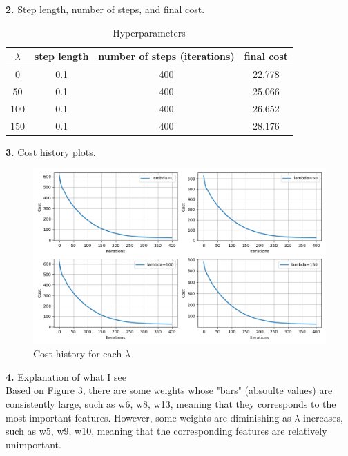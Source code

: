 \textbf{2.} Step length, number of steps, and final cost.
\begin{table}[H]
    \centering
    \begin{tabular}{|c|c|c|c|}
        \hline
         $\lambda$ &  step length &  number of steps (iterations) & final cost \\
        \hline
         0 & 0.1 & 400 & 22.778 \\
         50  & 0.1 & 400 & 25.066 \\
         100  & 0.1 & 400 & 26.652 \\
         150 & 0.1 & 400 & 28.176 \\
        \hline
    \end{tabular}
    \caption{Hyperparameters}
    \label{tab:hyperparams}
\end{table}

\textbf{3.} Cost history plots.

\begin{figure}[H]
    \centering
    \includegraphics[width=120mm]{task2-costs.png}
    \caption{Cost history for each $\lambda$}
    \label{fig:task2-cost}
\end{figure}

\textbf{4.} Explanation of what I see \\
Based on Figure 3, there are some weights whose "bars" (absoulte values) are consistently large, such as w6, w8, w13, meaning that they corresponds to the most important features. However, some weights are diminishing as $\lambda$ increases, such as w5, w9, w10, meaning that the corresponding features are relatively unimportant.

